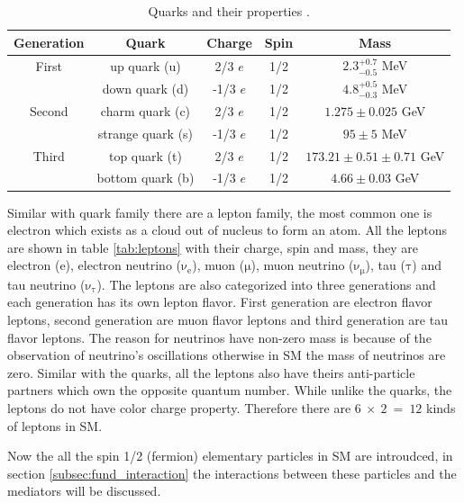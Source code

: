  \begin{table}[!hbpt]
 \begin{center}
 \begin{tabular}{|c|c|c|c|c|}
 \hline
 Generation           & Quark         & Charge      &Spin      & Mass \\ \hline
 First                & up quark (u)  & 2/3 $e$     &1/2       & $2.3^{+0.7}_{-0.5}$ MeV \\
                      & down quark (d)& -1/3 $e$    &1/2       & $4.8^{+0.5}_{-0.3}$ MeV \\ \hline
 Second               & charm quark (c)& 2/3 $e$    &1/2       & $1.275 \pm 0.025$ GeV \\
                      & strange quark (s)& -1/3 $e$ &1/2       & $95\pm 5$ MeV \\  \hline
 Third                & top quark (t)    & 2/3 $e$  &1/2       & $173.21\pm 0.51 \pm 0.71$ GeV \\
                      & bottom quark (b) & -1/3 $e$ &1/2       & $4.66 \pm 0.03$ GeV \\ \hline
 \end{tabular}
 \end{center}
 \caption{Quarks and their properties \cite{Olive:2016xmw}.\label{tab:quarks}}
 \end{table}

Similar with quark family there are a lepton family, the most common one is electron which exists as a cloud out of nucleus to form an atom. All the leptons are shown in table \ref{tab:leptons} with their charge, spin and mass, they are electron ($\mathrm{e}$), electron neutrino ($\mathrm{\nu_e}$), muon ($\mathrm{\mu}$), muon neutrino ($\mathrm{\nu_{\mu}}$), tau ($\mathrm{\tau}$) and tau neutrino ($\mathrm{\nu_{\tau}}$). The leptons are also categorized into three generations and each generation has its own lepton flavor. First generation are electron flavor leptons, second generation are muon flavor leptons and third generation are tau flavor leptons. The reason for neutrinos have non-zero mass is because of the observation of neutrino's oscillations otherwise in SM the mass of neutrinos are zero. Similar with the quarks, all the leptons also have theirs anti-particle partners which own the opposite quantum number. While unlike the quarks, the leptons do not have color charge property. Therefore there are $6~\times~2~=~12$ kinds of leptons in SM.

Now the all the spin 1/2 (fermion) elementary particles in SM are introudced, in section \ref{subsec:fund_interaction} the interactions between these particles and the mediators will be discussed.

